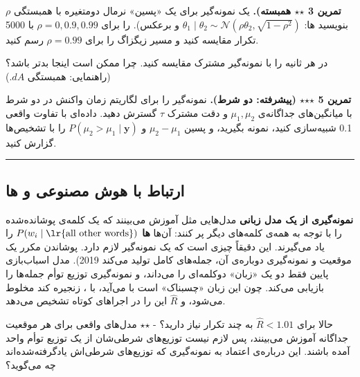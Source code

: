 \textbf{تمرین 3 \ensuremath{\star}\ensuremath{\star}  همبسته).} یک نمونه‌گیر  برای یک
«پسین» نرمال دومتغیره با همبستگی \(\rho\) بنویسید ها:
\(\theta_1\mid\theta_2 \sim \mathcal{N}(\rho\theta_2,\allowbreak \sqrt{1-\rho^2})\)
و برعکس).  را برای \(\rho = 0, 0.9, 0.99\) با 5000 تکرار مقایسه
کنید و مسیر زیگزاگ را برای \(\rho = 0.99\) رسم کنید.

 در هر ثانیه را با نمونه‌گیر  مشترک مقایسه کنید.
چرا ممکن است اینجا بدتر باشد؟ (راهنمایی: همبستگی \(A\)\lr{--}\(d\).)

\textbf{تمرین 5 \ensuremath{\star}\ensuremath{\star}\ensuremath{\star} (پیشرفته: دو شرط).} نمونه‌گیر  را برای
لگاریتم زمان واکنش در دو شرط با میانگین‌های جداگانه‌ی \(\mu_1, \mu_2\) و
دقت مشترک \(\tau\) گسترش دهید. داده‌ای با تفاوت واقعی 0.1 شبیه‌سازی کنید،
نمونه بگیرید، و پسین \(\mu_2 - \mu_1\) و
\(P(\mu_2 > \mu_1\mid\mathbf{y})\) را با تشخیص‌ها گزارش کنید.

\begin{center}\rule{0.5\linewidth}{0.5pt}\end{center}

\subsection{\texorpdfstring{ارتباط با هوش مصنوعی و
ها}{ارتباط با هوش مصنوعی و LLMها}}

\textbf{نمونه‌گیری  از یک مدل زبانی } مدل‌هایی مثل
 آموزش می‌بینند که یک کلمه‌ی پوشانده‌شده  را با توجه
به همه‌ی کلمه‌های دیگر پر کنند: آن‌ها \textbf{ها}
\(P(w_i \mid \text{\lr{all other words}})\) را یاد می‌گیرند. این دقیقاً چیزی
است که یک نمونه‌گیر  لازم دارد. پوشاندن مکرر یک موقعیت و
نمونه‌گیری دوباره‌ی آن، جمله‌های کامل تولید می‌کند  \lr{\&} 
2019). مدل اسباب‌بازی پایین فقط دو  یک «زبان»
دوکلمه‌ای را می‌داند، و نمونه‌گیری  توزیع توأم جمله‌ها را بازیابی
می‌کند. چون این زبان «چسبناک» است  با  می‌آید، 
با ، زنجیره کند مخلوط می‌شود، و \(\hat R\) این را در اجراهای
کوتاه تشخیص می‌دهد.

حالا برای \(\hat R < 1.01\) به چند تکرار نیاز دارید؟ - \ensuremath{\star}\ensuremath{\star} مدل‌های
 واقعی برای هر موقعیت جداگانه آموزش می‌بینند، پس لازم نیست
توزیع‌های شرطی‌شان از یک توزیع توأم واحد آمده باشند. این درباره‌ی اعتماد به
نمونه‌گیری که توزیع‌های شرطی‌اش یادگرفته‌شده‌اند چه می‌گوید؟

